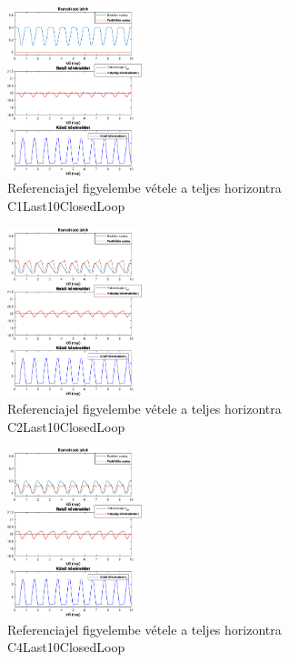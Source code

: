 \begin{figure}[H]
\centering
\includegraphics[width=0.35\textwidth, trim=0 0 0 0, clip,]{figures/onlab/NoSlope/C1Last10ClosedLoop}
\caption{Referenciajel figyelembe vétele a teljes horizontra C1Last10ClosedLoop}
\label{fig:onlab-refprev2}
\end{figure}

\begin{figure}[H]
\centering
\includegraphics[width=0.35\textwidth, trim=0 0 0 0, clip,]{figures/onlab/NoSlope/C2Last10ClosedLoop}
\caption{Referenciajel figyelembe vétele a teljes horizontra C2Last10ClosedLoop}
\label{fig:onlab-refprev3}
\end{figure}

\begin{figure}[H]
\centering
\includegraphics[width=0.35\textwidth, trim=0 0 0 0, clip,]{figures/onlab/NoSlope/C4Last10ClosedLoop}
\caption{Referenciajel figyelembe vétele a teljes horizontra C4Last10ClosedLoop}
\label{fig:onlab-refprev4}
\end{figure}


